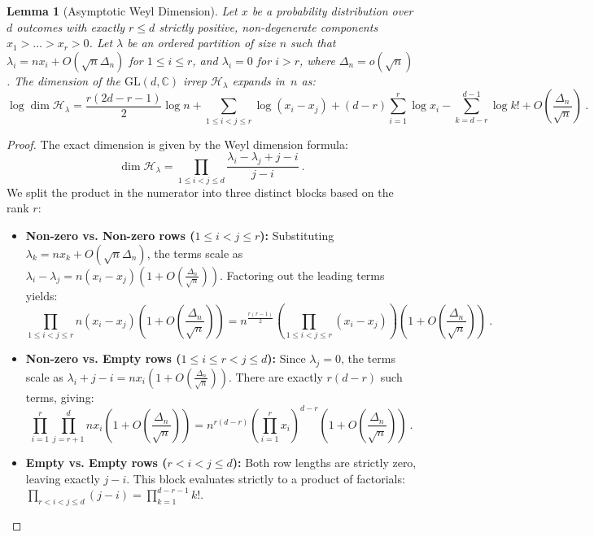 \documentclass[a4paper,onecolumn,11pt]{quantumarticle}
\newtheorem{lem}{Lemma}
\def\h{\mathcal{H}}
\begin{document}
\begin{lem}[Asymptotic Weyl Dimension]\label{lem:weyl_asymptotic}
    Let $x$ be a probability distribution over $d$ outcomes with exactly $r \le d$ strictly positive, non-degenerate components $x_1 > \dots > x_r > 0$. Let $\lambda$ be an ordered partition of size $n$ such that $\lambda_i = n x_i + O(\sqrt{n}\Delta_n)$ for $1 \le i \le r$, and $\lambda_i = 0$ for $i > r$, where $\Delta_n = o(\sqrt{n})$. The dimension of the $\mathrm{GL}(d, \mathbb{C})$ irrep $\mathcal{H}_\lambda$ expands in~$n$ as:
        $$\log \dim \mathcal{H}_\lambda = \frac{r(2d-r-1)}{2}\log n + \sum_{1 \le i < j \le r}\log(x_i-x_j) + (d-r)\sum_{i=1}^r \log x_i - \sum_{k=d-r}^{d-1}\log k! + O\left(\frac{\Delta_n}{\sqrt{n}}\right) \ .$$
\end{lem}
\begin{proof}
The exact dimension is given by the Weyl dimension formula:
\begin{equation}\label{eq:weyl_dim}
    \dim \h_\lambda = \prod_{1 \le i < j \le d} \frac{\lambda_i - \lambda_j + j - i}{j - i} \ .
\end{equation}
We split the product in the numerator into three distinct blocks based on the rank $r$:
\begin{itemize}
    \item \textbf{Non-zero vs. Non-zero rows ($1 \le i < j \le r$):} 
    Substituting $\lambda_k = n x_k + O(\sqrt{n}\Delta_n)$, the terms scale as $\lambda_i - \lambda_j = n(x_i - x_j) \left( 1 + O\left(\frac{\Delta_n}{\sqrt{n}}\right) \right)$. Factoring out the leading terms yields:
    \[
        \prod_{1 \le i < j \le r} n(x_i - x_j) \left( 1 + O\left(\frac{\Delta_n}{\sqrt{n}}\right) \right) = n^{\frac{r(r-1)}{2}} \left( \prod_{1 \le i < j \le r} (x_i - x_j) \right) \left( 1 + O\left(\frac{\Delta_n}{\sqrt{n}}\right) \right) \ .
    \]
    
    \item \textbf{Non-zero vs. Empty rows ($1 \le i \le r < j \le d$):}
    Since $\lambda_j = 0$, the terms scale as $\lambda_i + j - i = n x_i \left( 1 + O\left(\frac{\Delta_n}{\sqrt{n}}\right) \right)$. There are exactly $r(d-r)$ such terms, giving:
    \[
        \prod_{i=1}^r \prod_{j=r+1}^d n x_i \left( 1 + O\left(\frac{\Delta_n}{\sqrt{n}}\right) \right) = n^{r(d-r)} \left( \prod_{i=1}^r x_i \right)^{d-r} \left( 1 + O\left(\frac{\Delta_n}{\sqrt{n}}\right) \right) \ .
    \]
    
    \item \textbf{Empty vs. Empty rows ($r < i < j \le d$):}
    Both row lengths are strictly zero, leaving exactly $j - i$. This block evaluates strictly to a product of factorials: $\prod_{r < i < j \le d} (j - i) = \prod_{k=1}^{d-r-1} k!$.
\end{itemize}


\end{proof}
\end{document}
